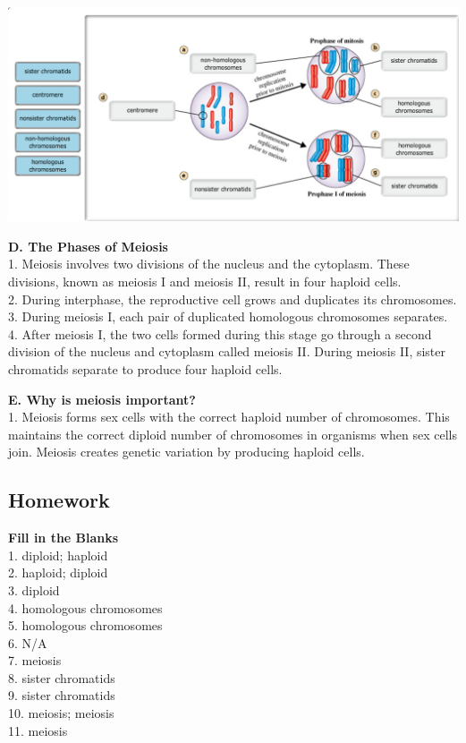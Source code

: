 \documentclass[
]{book}
\begin{document}
\includegraphics{./img/nonsis.png}

\textbf{D. The Phases of Meiosis}\\
1. Meiosis involves two divisions of the nucleus and the {cytoplasm}. These divisions, known as meiosis I and meiosis II, result in four haploid cells.\\
2. During {interphase}, the reproductive cell grows and duplicates its chromosomes.\\
3. During meiosis I, each pair of duplicated homologous chromosomes {separates}.\\
4. After meiosis I, the two cells formed during this stage go through a second division of the {nucleus} and cytoplasm called meiosis II. During meiosis II, sister {chromatids} separate to produce four haploid cells.

\textbf{E. Why is meiosis important?}\\
1. Meiosis forms sex cells with the correct haploid number of {chromosomes}. This maintains the correct {diploid} number of chromosomes in organisms when sex cells join. Meiosis creates genetic variation by producing {haploid} cells.

\hypertarget{homework-1}{%
\subsection{Homework}\label{homework-1}}

\textbf{Fill in the Blanks}\\
1. diploid; haploid\\
2. haploid; diploid\\
3. diploid\\
4. homologous chromosomes\\
5. homologous chromosomes\\
6. N/A\\
7. meiosis\\
8. sister chromatids\\
9. sister chromatids\\
10. meiosis; meiosis\\
11. meiosis
\end{document}
